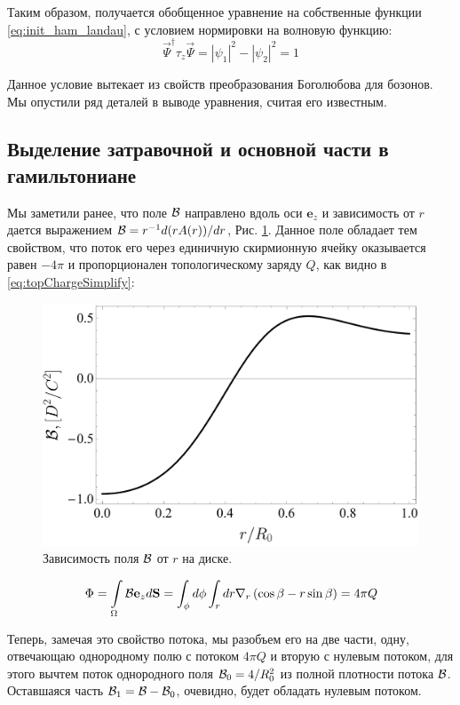 \documentclass[a4paper,article,14pt]{extarticle}
\begin{document}
Таким образом, получается обобщенное уравнение на собственные функции \eqref{eq:init_ham_landau}, с условием нормировки на волновую функцию:
$$
\vec{\Psi}^\dagger \tau_z \vec{\Psi} =|\psi_1|^2-|\psi_2|^2=1
$$

Данное условие вытекает из свойств преобразования Боголюбова для бозонов. Мы опустили ряд деталей в выводе уравнения, считая его известным.\cite{garst}


\subsection{Выделение затравочной и основной части в гамильтониане}

Мы заметили ранее, что поле $\cal B$ направлено вдоль оси $\mathbf{e}_z$ и зависимость от $r$ дается выражением  ${\cal B} = r^{-1} d(r A(r))/dr$, Рис. \ref{fig:B_top}. Данное поле обладает тем свойством, что поток его через единичную скирмионную ячейку оказывается равен $ -4\pi $ и пропорционален топологическому заряду  $Q$, как видно в \eqref{eq:topChargeSimplify}:


\begin{figure}[t]
\centering	
\includegraphics[width=0.9\columnwidth]{images/b_dependence.pdf}
\caption{Зависимость поля $\cal B$ от $r$ на диске. }
\label{fig:B_top}
\end{figure}


\begin{equation}
\Phi = \int \limits_\Omega {\cal B} \mathbf{e}_z d\mathbf{S} = \int_\phi d \phi \int_r d r \nabla_r \left(\cos\beta   -  r  \sin \beta \right)  = 4 \pi Q
\end{equation}

Теперь, замечая это свойство потока, мы разобъем его на две части, одну, отвечающаю однородному полю с потоком $4 \pi Q$ и вторую с нулевым потоком, для этого вычтем поток однородного поля ${\cal B}_{0} = 4/R_{0}^{2}$  из полной плотности потока  $\cal B$. Оставшаяся часть ${\cal B}_{1} = {\cal B} - {\cal B}_{0}$, очевидно, будет обладать нулевым потоком.
 
\end{document}

